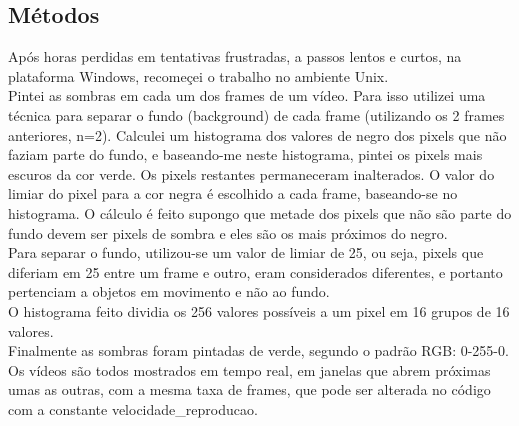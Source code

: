 \documentclass[twoside]{article}
\begin{document}
\begin{multicols}{2}
\section{Métodos}
Após horas perdidas em tentativas frustradas, a passos lentos e curtos, na plataforma Windows, recomeçei o trabalho no ambiente Unix. 
\\Pintei as sombras em cada um dos frames de um vídeo. Para isso utilizei uma técnica para separar o fundo (background) de cada frame (utilizando os 2 frames anteriores, n=2). Calculei um histograma dos valores de negro dos pixels que não faziam parte do fundo, e baseando-me neste histograma, pintei os pixels mais escuros da cor verde. Os pixels restantes permaneceram inalterados. O valor do limiar do pixel para a cor negra é escolhido a cada frame, baseando-se no histograma. O cálculo é feito supongo que metade dos pixels que não são parte do fundo devem ser pixels de sombra e eles são os mais próximos do negro.
\\Para separar o fundo, utilizou-se um valor de limiar de 25, ou seja, pixels que diferiam em 25 entre um frame e outro, eram considerados diferentes, e portanto pertenciam a objetos em movimento e não ao fundo.
\\O histograma feito dividia os 256 valores possíveis a um pixel em 16 grupos de 16 valores.
\\Finalmente as sombras foram pintadas de verde, segundo o padrão RGB: 0-255-0.
\\Os vídeos são todos mostrados em tempo real, em janelas que abrem próximas umas as outras, com a mesma taxa de frames, que pode ser alterada no código com a constante velocidade\_reproducao.






\end{multicols}
\end{document}
